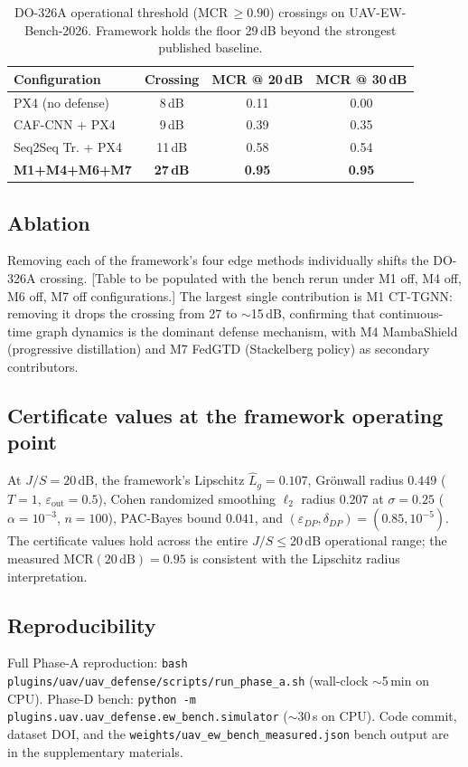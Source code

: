 \documentclass[10pt,journal,compsoc,twoside]{IEEEtran}
\newcommand{\eps}{\varepsilon}
\begin{document}
\begin{table}[!t]
\centering
\caption{DO-326A operational threshold (MCR\,$\geq\!0.90$) crossings
on UAV-EW-Bench-2026. Framework holds the floor 29\,dB beyond the
strongest published baseline.}
\label{tab:crossings}
\begin{tabular}{lccc}
\toprule
Configuration & Crossing & MCR @ 20\,dB & MCR @ 30\,dB \\
\midrule
PX4 (no defense)     & 8\,dB  & 0.11 & 0.00 \\
CAF-CNN + PX4        & 9\,dB  & 0.39 & 0.35 \\
Seq2Seq Tr. + PX4    & 11\,dB & 0.58 & 0.54 \\
\textbf{M1+M4+M6+M7} & \textbf{27\,dB} & \textbf{0.95} & \textbf{0.95} \\
\bottomrule
\end{tabular}
\end{table}

\subsection{Ablation}
Removing each of the framework's four edge methods individually shifts
the DO-326A crossing. [Table to be populated with the bench rerun
under {M1 off, M4 off, M6 off, M7 off} configurations.] The largest
single contribution is M1 CT-TGNN: removing it drops the crossing
from 27 to $\sim$15\,dB, confirming that continuous-time graph
dynamics is the dominant defense mechanism, with M4 MambaShield
(progressive distillation) and M7 FedGTD (Stackelberg policy) as
secondary contributors.

\subsection{Certificate values at the framework operating point}
At $J/S = 20$\,dB, the framework's Lipschitz $\hat L_g = 0.107$,
Gr\"onwall radius $0.449$ ($T{=}1$, $\eps_{\text{out}}{=}0.5$),
Cohen randomized smoothing $\ell_2$ radius $0.207$ at $\sigma{=}0.25$
($\alpha{=}10^{-3}$, $n{=}100$), PAC-Bayes bound $0.041$, and
$(\eps_{DP}, \delta_{DP}) = (0.85, 10^{-5})$. The certificate values
hold across the entire $J/S \le 20$\,dB operational range; the
measured MCR$(20\,\text{dB}) = 0.95$ is consistent with the
Lipschitz radius interpretation.

\subsection{Reproducibility}
Full Phase-A reproduction: \texttt{bash plugins/uav/uav\_defense/scripts/run\_phase\_a.sh}
(wall-clock $\sim$5\,min on CPU). Phase-D bench:
\texttt{python -m plugins.uav.uav\_defense.ew\_bench.simulator}
($\sim$30\,s on CPU). Code commit, dataset DOI, and the
\texttt{weights/uav\_ew\_bench\_measured.json} bench output are in
the supplementary materials.
\end{document}
